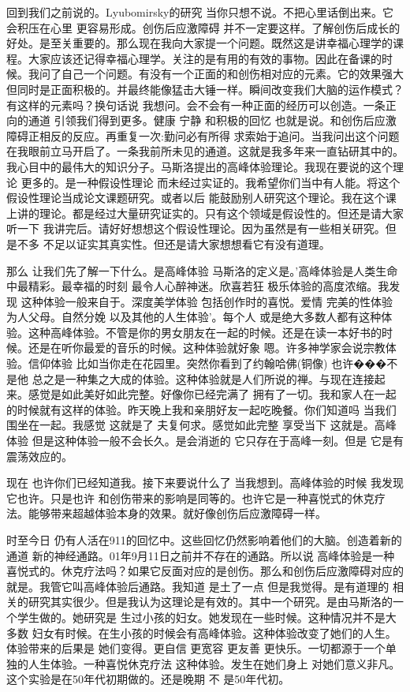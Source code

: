 回到我们之前说的。Lyubomirsky的研究 当你只想不说。不把心里话倒出来。它会积压在心里 更容易形成。创伤后应激障碍 并不一定要这样。了解创伤后成长的好处。是至关重要的。那么现在我向大家提一个问题。既然这是讲幸福心理学的课程。大家应该还记得幸福心理学。关注的是有用的有效的事物。因此在备课的时候。我问了自己一个问题。有没有一个正面的和创伤相对应的元素。它的效果强大 但同时是正面积极的。并最终能像猛击大锤一样。瞬间改变我们大脑的运作模式？有这样的元素吗？换句话说 我想问。会不会有一种正面的经历可以创造。一条正向的通道 引领我们得到更多。健康 宁静 和积极的回忆 也就是说。和创伤后应激障碍正相反的反应。再重复一次:勤问必有所得 求索始于追问。当我问出这个问题 在我眼前立马开启了。一条我前所未见的通道。这就是我多年来一直钻研其中的。我心目中的最伟大的知识分子。马斯洛提出的高峰体验理论。我现在要说的这个理论 更多的。是一种假设性理论 而未经过实证的。我希望你们当中有人能。将这个假设性理论当成论文课题研究。或者以后 能鼓励别人研究这个理论。我在这个课上讲的理论。都是经过大量研究证实的。只有这个领域是假设性的。但还是请大家听一下 我讲完后。请好好想想这个假设性理论。因为虽然是有一些相关研究。但是不多 不足以证实其真实性。但还是请大家想想看它有没有道理。 

那么 让我们先了解一下什么。是高峰体验 马斯洛的定义是。'高峰体验是人类生命中最精彩。最幸福的时刻 最令人心醉神迷。欣喜若狂 极乐体验的高度浓缩。我发现 这种体验一般来自于。深度美学体验 包括创作时的喜悦。爱情 完美的性体验 为人父母。自然分娩 以及其他的人生体验'。每个人 或是绝大多数人都有这种体验。这种高峰体验。不管是你的男女朋友在一起的时候。还是在读一本好书的时候。还是在听你最爱的音乐的时候。这种体验就好象 嗯。许多神学家会说宗教体验。信仰体验 比如当你走在花园里。突然你看到了约翰哈佛(铜像) 也许���不是他 总之是一种集之大成的体验。这种体验就是人们所说的禅。与现在连接起来。感觉是如此美好如此完整。好像你已经完满了 拥有了一切。我和家人在一起的时候就有这样的体验。昨天晚上我和亲朋好友一起吃晚餐。你们知道吗 当我们围坐在一起。我感觉 这就是了 夫复何求。感觉如此完整 享受当下 这就是。高峰体验 但是这种体验一般不会长久。是会消逝的 它只存在于高峰一刻。但是 它是有震荡效应的。 

现在 也许你们已经知道我。接下来要说什么了 当我想到。高峰体验的时候 我发现它也许。只是也许 和创伤带来的影响是同等的。也许它是一种喜悦式的休克疗法。能够带来超越体验本身的效果。就好像创伤后应激障碍一样。 

时至今日 仍有人活在911的回忆中。这些回忆仍然影响着他们的大脑。创造着新的通道 新的神经通路。01年9月11日之前并不存在的通路。所以说 高峰体验是一种喜悦式的。休克疗法吗？如果它反面对应的是创伤。那么和创伤后应激障碍对应的就是。我管它叫高峰体验后通路。我知道 是土了一点 但是我觉得。是有道理的 相关的研究其实很少。但是我认为这理论是有效的。其中一个研究。是由马斯洛的一个学生做的。她研究是 生过小孩的妇女。她发现在一些时候。这种情况并不是大多数 妇女有时候。在生小孩的时候会有高峰体验。这种体验改变了她们的人生。体验带来的后果是 她们变得。更自信 更宽容 更友善 更快乐。一切都源于一个单独的人生体验。一种喜悦休克疗法 这种体验。发生在她们身上 对她们意义非凡。这个实验是在50年代初期做的。还是晚期 不 是50年代初。 


